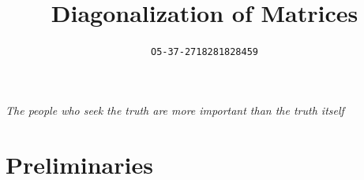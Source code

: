 \documentclass[11pt]{article}
\title{Diagonalization of Matrices}
\author{\texttt{O5-37-2718281828459}}
\begin{document}
    \maketitle

    \newpage
    \vspace*{\fill}
    \begin{center}
        \LARGE
        \selectfont\itshape
        The people who seek the truth are more important than the truth itself \\
    \end{center}
    {
        \Large
    }
    \vspace*{\fill}

    \newpage
    \tableofcontents
    
    \newpage
    \setcounter{section}{-1}
    \section{Preliminaries}
\end{document}
